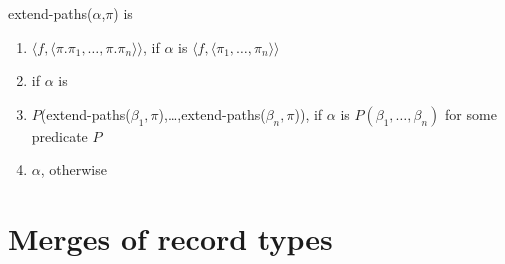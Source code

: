 extend-paths($\alpha$,$\pi$) is
\begin{enumerate} 
 
\item $\langle f, \langle \pi.\pi_1,\ldots,\pi.\pi_n\rangle\rangle$,
  if $\alpha$ is $\langle f, \langle \pi_1,\ldots,\pi_n\rangle\rangle$ 
 
\item {} if $\alpha$
            is 

\item
  $P$(extend-paths($\beta_1,\pi$),\ldots,extend-paths($\beta_n,\pi$)),
  if $\alpha$ is $P(\beta_1,\ldots,\beta_n)$ for some predicate $P$


\item $\alpha$, otherwise
 
\end{enumerate} 


\section{Merges of record types}
\label{app:merge}


